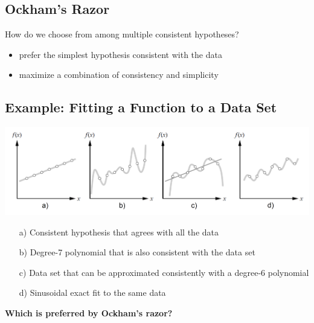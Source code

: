 \documentclass[conference, a4paper]{styles/acmsiggraph}
\begin{document}
    \subsection{Ockham's Razor}
        How do we choose from among multiple consistent hypotheses?
        \begin{itemize}
            \item prefer the simplest hypothesis consistent with the data
            \item maximize a combination of consistency and simplicity
        \end{itemize}

    \subsection{Example: Fitting a Function to a Data Set}
        \includegraphics[width=1\textwidth]{imgs/Polynomials.png}
        \begin{itemize}
            \item[a)] Consistent hypothesis that agrees with all the data
            \item[b)] Degree-7 polynomial that is also consistent with the data set
            \item[c)] Data set that can be approximated consistently with a degree-6 polynomial
            \item[d)] Sinusoidal exact fit to the same data
        \end{itemize}
        \textbf{Which is preferred by Ockham's razor?}
\end{document}

